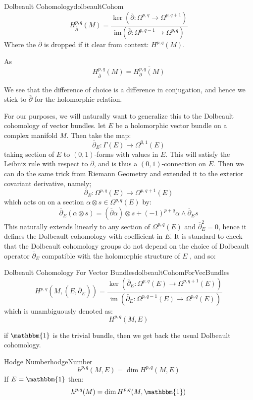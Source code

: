 \documentclass{book}
\newcommand{\im}{{\operatorname{im}}}
\begin{document}
\begin{defn}{Dolbeault Cohomology}{dolbeaultCohom}
  \[
H_{\overline{\partial}}^{p,q}(M) = \frac{\ker(\overline{\partial}: \Omega^{p,q} \to \Omega^{p,q+1})}{\text{im}(\overline{\partial}: \Omega^{p,q-1} \to \Omega^{p,q})}
\]
Where the $\overline{\partial}$ is dropped if it clear from context: $H^{p,q}(M)$.
\end{defn}

As
\[
  H_{\overline{\partial}}^{p,q}(M) = \overline{H_{\partial}^{p,q}(M)}
\]

We see that the difference of choice is a difference in conjugation, and hence we stick to
$\overline{\partial}$ for the holomorphic relation.

For our purposes, we will naturally want to generalize this to the Dolbeault cohomology of vector bundles. let
$E$ be a holomorphic vector bundle on a complex manifold $M$. Then take the map:
\[
  \overline{\partial}_E: \Gamma(E) \to \Omega^{0,1}(E)
\]
taking section of $E$ to $(0,1)$-forms with values in $E$. This will satisfy the Leibniz rule with respect to
$\overline{\partial}$, and is thus a $(0,1)$-connection on $E$. Then we can do the same trick from Riemann
Geometry and extended it to the exterior covariant derivative, namely;
\[
  \overline{\partial}_E: \Omega^{p,q}(E) \to \Omega^{p, q+1}(E)
\]
which acts on on a section $\alpha \otimes s \in \Omega^{p,q}(E)$ by:
\[
  \overline{\partial}_E(\alpha\otimes s) = (\overline{\partial}\alpha) \otimes s + (-1)^{p+q}\alpha \wedge
  \overline{\partial}_E s
\]
This naturally extends linearly to any section of $\Omega^{p,q}(E)$ and $\overline{\partial}_E^2 = 0$, hence
it defines the Dolbeault cohomology with coefficient in $E$. It is standard to check that the Dolbeault
cohomology groups do not depend on the choice of Dolbeault operator
$\overline{\partial}_E$ compatible with the holomorphic structure of $E$
\cite{gallierComplexAlgebraicGeometry2011}, and so:
\begin{defn}{Dolbeault Cohomology For Vector Bundles}{dolbeaultCohomForVecBundles}
  \[
H^{p,q}(M,(E,\bar{\partial}_E)) = \frac{\ker(\bar{\partial}_E : \Omega^{p,q}(E) \to \Omega^{p,q+1}(E))}{\im(\bar{\partial}_E : \Omega^{p,q-1}(E) \to \Omega^{p,q}(E))}
\]
which is unambiguously denoted as:
\[
  H^{p,q}(M,E)
\]
\end{defn}
if $\mathbbm{1}$ is the trivial bundle, then we get back the usual Dolbeault cohomology.

\begin{defn}{Hodge Number}{hodgeNumber}
  \[
    h^{p,q}(M,E) = \dim H^{p,q}(M,E)
  \]
  If $E = \mathbbm{1}$ then:
  \[
    h^{p,q}(M) = \dim H^{p,q}(M,\mathbbm{1})
  \]
\end{defn}
\end{document}
